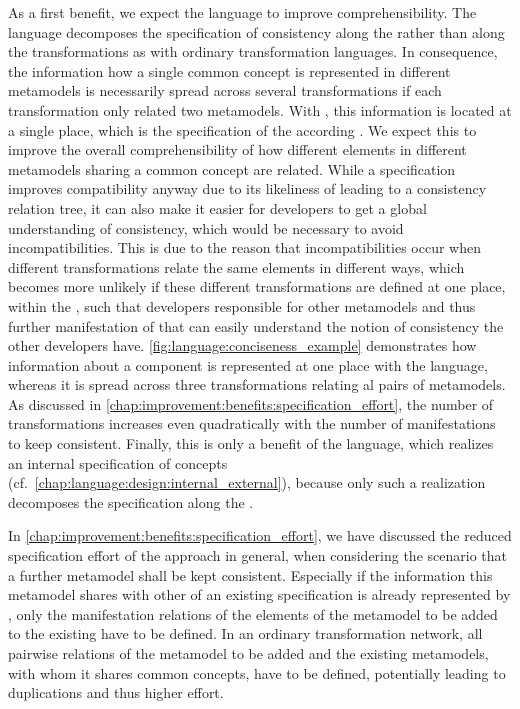 As a first benefit, we expect the \commonalities language to improve comprehensibility.
The language decomposes the specification of consistency along the \commonalities rather than along the transformations as with ordinary transformation languages.
In consequence, the information how a single common concept is represented in different metamodels is necessarily spread across several transformations if each transformation only related two metamodels.
With \commonalities, this information is located at a single place, which is the specification of the according \commonality.
We expect this to improve the overall comprehensibility of how different elements in different metamodels sharing a common concept are related.
While a \commonalities specification improves compatibility anyway due to its likeliness of leading to a consistency relation tree, it can also make it easier for developers to get a global understanding of consistency, which would be necessary to avoid incompatibilities.
This is due to the reason that incompatibilities occur when different transformations relate the same elements in different ways, which becomes more unlikely if these different transformations are defined at one place, within the \commonality, such that developers responsible for other metamodels and thus further manifestation of that \commonality can easily understand the notion of consistency the other developers have.
\autoref{fig:language:conciseness_example} demonstrates how information about a component \commonality is represented at one place with the \commonalities language, whereas it is spread across three \qvtr transformations relating al pairs of metamodels.
As discussed in \autoref{chap:improvement:benefits:specification_effort}, the number of transformations increases even quadratically with the number of manifestations to keep consistent.
Finally, this is only a benefit of the \commonalities language, which realizes an internal specification of concepts (cf.\ \autoref{chap:language:design:internal_external}), because only such a realization decomposes the specification along the \commonalities.

In \autoref{chap:improvement:benefits:specification_effort}, we have discussed the reduced specification effort of the \commonalities approach in general, when considering the scenario that a further metamodel shall be kept consistent.
Especially if the information this metamodel shares with other \concretemetamodels of an existing \commonalities specification is already represented by \commonalities, only the manifestation relations of the elements of the metamodel to be added to the existing \commonalities have to be defined.
In an ordinary transformation network, all pairwise relations of the metamodel to be added and the existing metamodels, with whom it shares common concepts, have to be defined, potentially leading to duplications and thus higher effort.

